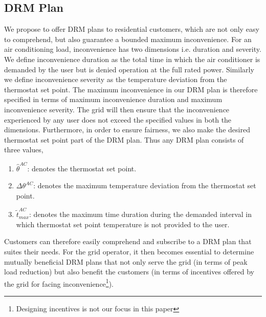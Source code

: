 \documentclass[10pt,twocolumn,twoside]{IEEEtran}
\begin{document}
\subsection{DRM Plan}
We propose to offer DRM plans to residential customers, which are not only easy to comprehend, but also guarantee a bounded maximum inconvenience. For an air conditioning load, inconvenience has two dimensions i.e. duration and severity. We define inconvenience duration as the total time in which the air conditioner is demanded by the user but is denied operation at the full rated power. Similarly we define inconvenience severity as the temperature deviation from the thermostat set point. The maximum inconvenience in our DRM plan is therefore specified in terms of maximum inconvenience duration and maximum inconvenience severity. The grid will then ensure that the inconvenience experienced by any user does not exceed the specified values in both the dimensions. 
Furthermore, in order to ensure fairness, we also make the desired thermostat set point part of the DRM plan. Thus any DRM plan consists of three values, 
\begin{enumerate}
	\item $\hat{\theta}^{AC}$: denotes the thermostat set point. 
	\item $\Delta{\theta^{AC}}$: denotes the maximum temperature deviation from the thermostat set point.
	\item $\tilde{t}^{AC}_{max}$: denotes the maximum time duration during the demanded interval in which thermostat set point temperature is not provided to the user.
\end{enumerate}
Customers can therefore easily comprehend and subscribe to a DRM plan that suites their needs. For the grid operator, it then becomes essential to determine mutually beneficial DRM plans that not only serve the grid (in terms of peak load reduction) but also benefit the customers (in terms of incentives offered by the grid for facing inconvenience\footnote{Designing incentives is not our focus in this paper}). 
\end{document}
